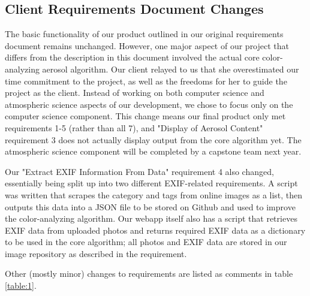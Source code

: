 \documentclass[onecolumn, draftclsnofoot,10pt, compsoc]{IEEEtran}
\begin{document}
\begin{flushleft}
\subsection{Client Requirements Document Changes}
The basic functionality of our product outlined in our original requirements document remains unchanged. However, one major aspect of our project that differs from the description in this document involved the actual core color-analyzing aerosol algorithm. Our client relayed to us that she overestimated our time commitment to the project, as well as the freedoms for her to guide the project as the client. Instead of working on both computer science and atmospheric science aspects of our development, we chose to focus only on the computer science component. This change means our final product only met requirements 1-5 (rather than all 7), and "Display of Aerosol Content" requirement 3 does not actually display output from the core algorithm yet. The atmospheric science component will be completed by a capstone team next year. 
 
Our "Extract EXIF Information From Data" requirement 4 also changed, essentially being split up into two different EXIF-related requirements. A script was written that scrapes the category and tags from online images as a list, then outputs this data into a JSON file to be stored on Github and used to improve the color-analyzing algorithm. Our webapp itself also has a script that retrieves EXIF data from uploaded photos and returns required EXIF data as a dictionary to be used in the core algorithm; all photos and EXIF data are stored in our image repository as described in the requirement. 
 
Other (mostly minor) changes to requirements are listed as comments in table \ref{table:1}.
 

\end{flushleft}
\end{document}
